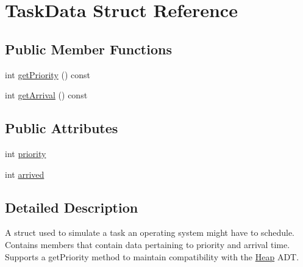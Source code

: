 \hypertarget{struct_task_data}{\section{\-Task\-Data \-Struct \-Reference}
\label{struct_task_data}
}
\subsection*{\-Public \-Member \-Functions}
\begin{DoxyCompactItemize}
\item 
int \hyperlink{struct_task_data_a58cbe6eec8a86be7b827561a2f4b49c1}{get\-Priority} () const 
\item 
int \hyperlink{struct_task_data_a274a90c28f483fb7c8364c4e1441d8ff}{get\-Arrival} () const 
\end{DoxyCompactItemize}
\subsection*{\-Public \-Attributes}
\begin{DoxyCompactItemize}
\item 
int \hyperlink{struct_task_data_a9d8b606897eb428a62d816b71312e1b7}{priority}
\item 
int \hyperlink{struct_task_data_a126fafee3369b6a2d8734f4e46c670bc}{arrived}
\end{DoxyCompactItemize}


\subsection{\-Detailed \-Description}
\-A struct used to simulate a task an operating system might have to schedule. \-Contains members that contain data pertaining to priority and arrival time. \-Supports a get\-Priority method to maintain compatibility with the \hyperlink{class_heap}{\-Heap} \-A\-D\-T. 

